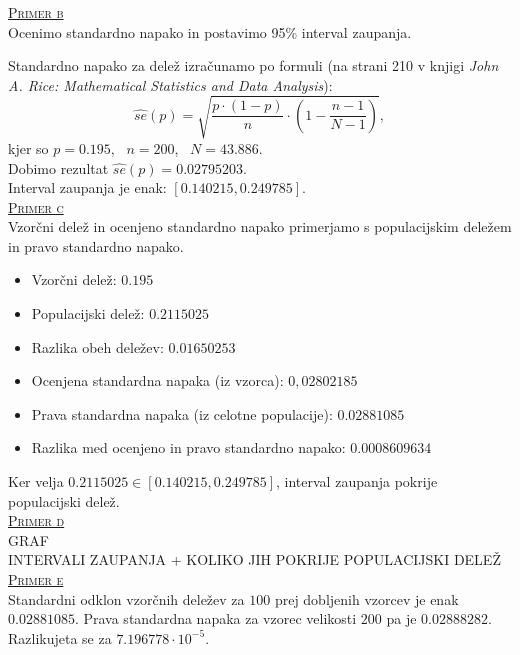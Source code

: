 \documentclass[a4paper,12pt]{article}
\begin{document}

\noindent
\textsc{\underline{Primer b}}
\\
Ocenimo standardno napako in postavimo 95\% interval zaupanja.

\noindent
Standardno napako za delež izračunamo po formuli (na strani 210 v knjigi \textit{John A. Rice: Mathematical Statistics and Data Analysis}):
$$ \hat{se}(p) = \sqrt{ \frac{p \cdot (1-p)}{n} \cdot \left(1 - \frac{n - 1}{N - 1} \right)}, $$
kjer so $p = 0.195$, \ $n = 200$, \ $N = 43.886$. 
\\
Dobimo rezultat $\hat{se}(p) = 0.02795203$.
\\
Interval zaupanja je enak: $[0.140215, 0.249785]$.
\\


\noindent
\textsc{\underline{Primer c}}
\\
Vzorčni delež in ocenjeno standardno napako primerjamo s populacijskim deležem in pravo standardno napako. 
\\
\begin{itemize}
\item Vzorčni delež: $0.195$ 
\item Populacijski delež: $0.2115025$ 
\item Razlika obeh deležev: $0.01650253$
\item Ocenjena standardna napaka (iz vzorca): $0,02802185$
\item Prava standardna napaka (iz celotne populacije):  $0.02881085$
\item Razlika med ocenjeno in pravo standardno napako: $0.0008609634$
\end{itemize}
Ker velja $0.2115025 \in [0.140215, 0.249785]$, interval zaupanja pokrije populacijski delež.
\\


\noindent
\textsc{\underline{Primer d}}
\\
GRAF 
\\
INTERVALI ZAUPANJA + KOLIKO JIH POKRIJE POPULACIJSKI DELEŽ
\\


\noindent
\textsc{\underline{Primer e}}
\\
Standardni odklon vzorčnih deležev za $100$ prej dobljenih vzorcev je enak $0.02881085$. Prava standardna napaka za vzorec velikosti $200$ pa je $0.02888282$.
Razlikujeta se za $7.196778 \cdot 10^{-5}$.
\\
\end{document}
